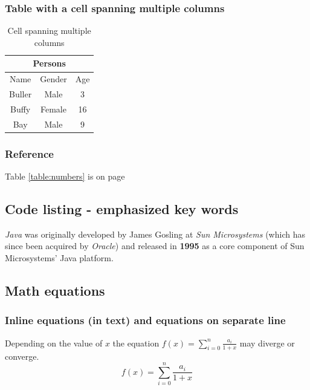 \documentclass{article}
\begin{document}
        \subsubsection{Table with a cell spanning multiple columns}
            \begin{table}[!h]
                \begin{tabular}{|c|c|c|}
                    \hline
                    \multicolumn{3}{|c|}{Persons} \\ [1ex]
                    \hline
                    Name & Gender & Age \\ [1ex]
                    \hline
                    Buller & Male & 3 \\ 
                    Buffy & Female & 16 \\ 
                    Bay & Male & 9 \\ 
                    \hline
                \end{tabular}
                \centering
                \caption{Cell spanning multiple columns}
                \label{table:persons}
            \end{table}   
             
            \subsubsection{Reference}
            
            Table \ref{table:numbers} is on page \pageref{table:numbers}
    
    \newpage
    \subsection{Code listing - emphasized key words}
    \emph{Java} was originally developed by James Gosling at \emph{Sun Microsystems} (which has since been acquired by \emph{Oracle}) and released in \textbf{1995} as a core component of Sun Microsystems' Java platform. 

    \subsection{Math equations}
        \subsubsection{Inline equations (in text) and equations on separate line}
            Depending on the value of $x$ the equation \( f(x) = \sum_{i=0}^{n} \frac{a_i}{1+x} \) may diverge or converge.
            \[ f(x) = \sum_{i=0}^{n} \frac{a_i}{1+x} \]
    
\end{document}
